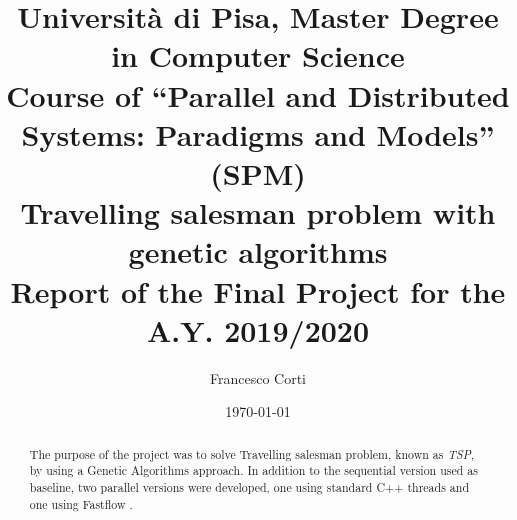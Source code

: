 \documentclass[a4paper, oneside, openany]{article}
\title{{\small Università di Pisa, Master Degree in Computer Science \\ Course of ``Parallel and Distributed Systems: Paradigms and Models'' (SPM)} \\ \vspace{0.7em}
	\huge{\textbf{Travelling salesman problem with genetic algorithms}} \\\vspace{0.7em}
	\large Report of the Final Project for the A.Y. 2019/2020 \\ \vspace{0.9em}}
\author{Francesco Corti \\ \vspace{0.7em}
	\vspace{0.4em}}
\date{\today}
\begin{document}
		\maketitle
		\begin{abstract}
			The purpose of the project was to solve Travelling salesman problem, known as \textit{TSP},  by using a Genetic Algorithms approach.
			In addition to the sequential version used as baseline, two parallel versions were developed, one using standard C++ threads and one using Fastflow \cite{fastflow}. 
		\end{abstract}
\vspace{0.3cm}







\end{document}
